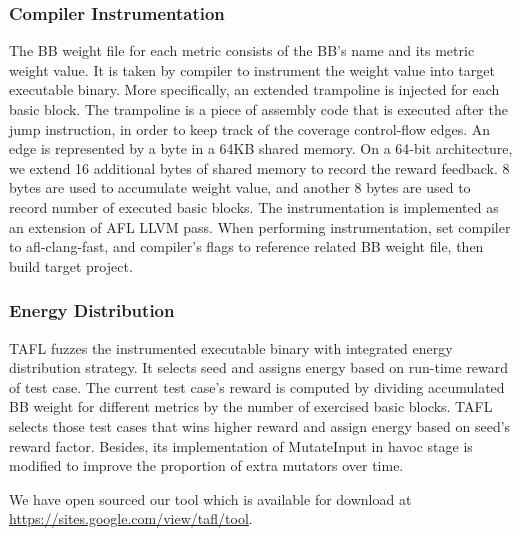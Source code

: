\subsubsection{Compiler Instrumentation}
The BB weight file for each metric consists of the BB's name and its metric weight value. It is taken by compiler to instrument the weight value into target executable binary. More specifically, an extended trampoline is injected for each basic block. The trampoline is a piece of assembly code that is executed after the jump instruction, in order to keep track of the coverage control-flow edges. An edge is represented by a byte in a 64KB shared memory. On a 64-bit architecture, we extend 16 additional bytes of shared memory to record the reward feedback. 8 bytes are used to accumulate weight value, and another 8 bytes are used to record number of executed basic blocks. The instrumentation is implemented as an extension of AFL LLVM pass. When performing instrumentation, set compiler to afl-clang-fast, and compiler's flags to reference related BB weight file, then build target project.

\subsubsection{Energy Distribution}
TAFL fuzzes the instrumented executable binary with integrated energy distribution strategy. It selects seed and assigns energy based on run-time reward of test case. The current test case's reward is computed by dividing accumulated BB weight for different metrics by the number of exercised basic blocks. TAFL selects those test cases that wins higher reward and assign energy based on seed's reward factor. Besides, its implementation of MutateInput in havoc stage is modified to improve the proportion of extra mutators over time.

We have open sourced our tool which is available for download at \url{https://sites.google.com/view/tafl/tool}.